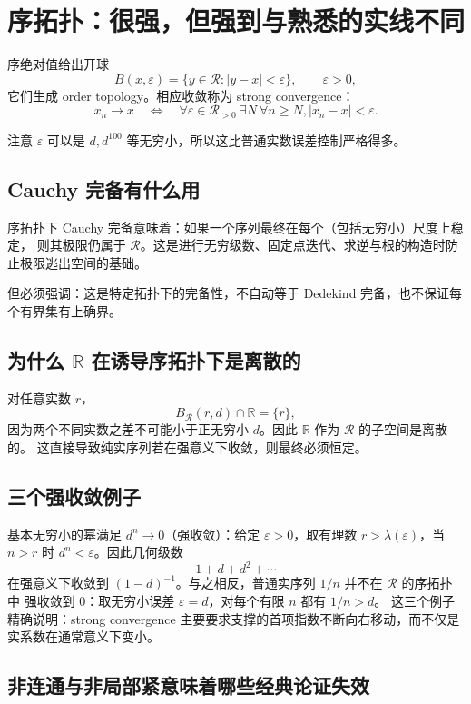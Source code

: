 \documentclass[11pt,a4paper]{article}
\theoremstyle{remark}
\newcommand{\LC}{\mathcal R}
\newcommand{\R}{\mathbb R}
\begin{document}
\section{序拓扑：很强，但强到与熟悉的实线不同}

序绝对值给出开球
\[
B(x,\varepsilon)=\{y\in\LC:|y-x|<\varepsilon\},\qquad \varepsilon>0,
\]
它们生成 order topology。相应收敛称为 strong convergence：
\[
x_n\to x\quad\Longleftrightarrow\quad
\forall\varepsilon\in\LC_{>0}\ \exists N\ \forall n\ge N, |x_n-x|<\varepsilon.
\]

注意 $\varepsilon$ 可以是 $d,d^{100}$ 等无穷小，所以这比普通实数误差控制严格得多。

\subsection{Cauchy 完备有什么用}

序拓扑下 Cauchy 完备意味着：如果一个序列最终在每个（包括无穷小）尺度上稳定，
则其极限仍属于 $\LC$。这是进行无穷级数、固定点迭代、求逆与根的构造时防止极限逃出空间的基础。

但必须强调：这是特定拓扑下的完备性，不自动等于 Dedekind 完备，也不保证每个有界集有上确界。

\subsection{为什么 $\R$ 在诱导序拓扑下是离散的}

对任意实数 $r$，
\[
B_{\LC}(r,d)\cap\R=\{r\},
\]
因为两个不同实数之差不可能小于正无穷小 $d$。因此 $\R$ 作为 $\LC$ 的子空间是离散的。
这直接导致纯实序列若在强意义下收敛，则最终必须恒定。

\subsection{三个强收敛例子}

基本无穷小的幂满足 $d^n\to0$（强收敛）：给定 $\varepsilon>0$，取有理数
$r>\lambda(\varepsilon)$，当 $n>r$ 时 $d^n<\varepsilon$。因此几何级数
\[
1+d+d^2+\cdots
\]
在强意义下收敛到 $(1-d)^{-1}$。与之相反，普通实序列 $1/n$ 并不在 $\LC$ 的序拓扑中
强收敛到 $0$：取无穷小误差 $\varepsilon=d$，对每个有限 $n$ 都有 $1/n>d$。
这三个例子精确说明：strong convergence 主要要求支撑的首项指数不断向右移动，而不仅是
实系数在通常意义下变小。

\subsection{非连通与非局部紧意味着哪些经典论证失效}
\end{document}
